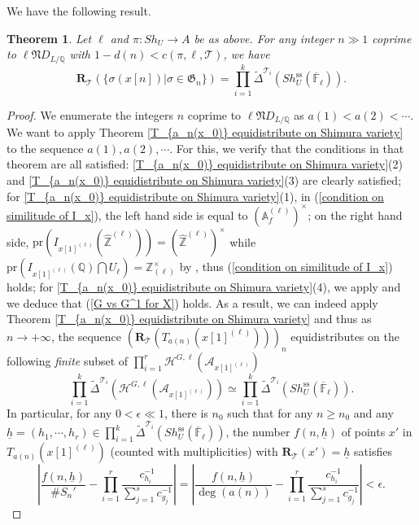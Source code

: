 \documentclass[11pt,oneside,reqno]{amsart}
\newcommand{\pr}{\mathrm{pr}}
\newcommand{\ssrm}{\mathrm{ss}}
\newcommand{\A}{\mathbb{A}}
\newcommand{\F}{\mathbb{F}}
\newcommand{\Q}{\mathbb{Q}}
\newcommand{\Z}{\mathbb{Z}}
\newcommand{\Acal}{\mathcal{A}}
\newcommand{\Hcal}{\mathcal{H}}
\newcommand{\Tcal}{\mathcal{T}}
\newcommand{\Rbf}{\mathbf{R}}
\newcommand{\Gfrak}{\mathfrak{G}}
\newcommand{\Nfrak}{\mathfrak{N}}
\theoremstyle{plain}
\newtheorem{theorem}{Theorem}[section]
\begin{document}
	
	We have the following result.
	\begin{theorem}\label{Galois orbit equidistributes}
		Let $\ell$ and $\pi\colon Sh_U\to A$ be as above. For any integer $n\gg1$ coprime to $\ell\Nfrak D_{L/\Q}$ with $1-d(n)<c(\pi,\ell,\Tcal)$, we have
		\[
		\Rbf_{\Tcal}(\{\sigma(x[n])|\sigma\in \Gfrak_n\})
		=
		\prod_{i=1}^k\widetilde{\Delta}^{\Tcal_i}(Sh_U^\ssrm(\overline{\F}_\ell)).
		\]
		
		
		
	\end{theorem}
	\begin{proof}
		We enumerate the integers $n$ coprime to $\ell\Nfrak D_{L/\Q}$ as $a(1)<a(2)<\cdots$. We want to apply Theorem \ref{T_{a_n(x_0)} equidistribute on Shimura variety} to the sequence $a(1),a(2),\cdots$. For this, we verify that the conditions in that theorem are all satisfied:
		\ref{T_{a_n(x_0)} equidistribute on Shimura variety}(2) and \ref{T_{a_n(x_0)} equidistribute on Shimura variety}(3) are clearly satisfied; for \ref{T_{a_n(x_0)} equidistribute on Shimura variety}(1), in (\ref{condition on similitude of I_x}), the left hand side is equal to $(\A_f^{(\ell)})^\times$; on the right hand side, $\pr(I_{x[1]^{(\ell)}}(\widehat{\Z}^{(\ell)}))
		=(\widehat{\Z}^{(\ell)})^\times$ while
		$\pr(I_{x[1]^{(\ell)}}(\Q)\bigcap U_\ell)
		=\Z_{(\ell)}^\times$ by \cite[p.90]{Vigneras1980}, thus (\ref{condition on similitude of I_x}) holds; for \ref{T_{a_n(x_0)} equidistribute on Shimura variety}(4), we apply \cite[Proposition 3.4]{Cornut2002} and we deduce that (\ref{G vs G^1 for X}) holds. As a result, we can indeed apply Theorem \ref{T_{a_n(x_0)} equidistribute on Shimura variety} and thus as $n\to+\infty$, the sequence $(\Rbf_{\Tcal}(T_{a(n)}(x[1]^{(\ell)})))_n$ equidistributes on the following \emph{finite} subset of $\prod_{i= 1}^r\Hcal^{G,\ell}(\Acal_{x[1]^{(\ell)}})$
		\[
		\prod_{i=1}^k\widetilde{\Delta}^{\Tcal_i}(\Hcal^{G,\ell}(\Acal_{x[1]^{(\ell)}}))
		\simeq
		\prod_{i=1}^k\widetilde{\Delta}^{\Tcal_i}(Sh_U^\ssrm(\overline{\F}_\ell)).
		\]
		In particular, for any $0<\epsilon\ll1$, there is $n_0$ such that for any $n\ge n_0$ and any $\underline{h}=(h_1,\cdots,h_r)\in\prod_{i=1}^k\widetilde{\Delta}^{\Tcal_i}(Sh_U^\ssrm(\overline{\F}_\ell))$, the number $f(n,\underline{h})$ of points $x'$ in $T_{a(n)}(x[1]^{(\ell)})$ (counted with multiplicities) with $\Rbf_{\Tcal}(x')=\underline{h}$ satisfies
		\begin{equation}\label{|f(n,h)/S_n'-...|<epsilon}
			\left|
			\frac{f(n,\underline{h})}{\#S_n'}-\prod_{i=1}^r\frac{c_{h_i}^{-1}}{\sum_{j=1}^sc_{g_j}^{-1}}
			\right|
			=
			\left|
			\frac{f(n,\underline{h})}{\deg(a(n))}-\prod_{i=1}^r\frac{c_{h_i}^{-1}}{\sum_{j=1}^sc_{g_j}^{-1}}
			\right|<\epsilon.
		\end{equation}
		

\end{proof}
\end{document}
